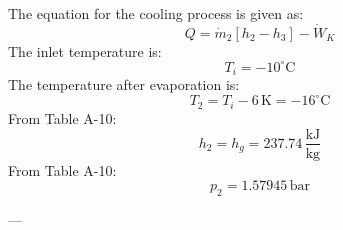The equation for the cooling process is given as:  
\[
Q = \dot{m}_2 \left[ h_2 - h_3 \right] - \dot{W}_K
\]  
The inlet temperature is:  
\[
T_i = -10^\circ\text{C}
\]  
The temperature after evaporation is:  
\[
T_2 = T_i - 6 \, \text{K} = -16^\circ\text{C}
\]  
From Table A-10:  
\[
h_2 = h_g = 237.74 \, \frac{\text{kJ}}{\text{kg}}
\]  
From Table A-10:  
\[
p_2 = 1.57945 \, \text{bar}
\]

---